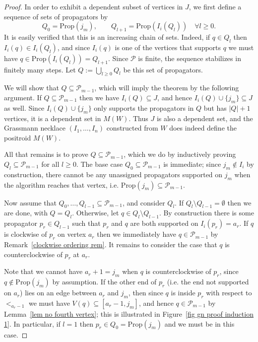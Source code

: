 \documentclass[11pt]{article}
\newcommand{\cP}{\mathcal{P}}
\newcommand{\Prop}{\textrm{Prop}}
\theoremstyle{remark}
\theoremstyle{definition}
\begin{document}
\begin{proof}
In order to exhibit a dependent subset of vertices in $J$, we first define a sequence of sets of propagators by
\[Q_0 = \Prop(j_m), \qquad Q_{l+1} = \Prop(I_i(Q_l))\quad \forall l \geq 0.\]
It is easily verified that this is an increasing chain of sets.  Indeed, if $q \in Q_l$ then $I_i(q) \in I_i(Q_l)$, and since $I_i(q)$ is one of the vertices that supports $q$ we must have $q \in \Prop(I_i(Q_l)) = Q_{l+1}$. Since $\cP$ is finite, the sequence stabilizes in finitely many steps. Let $Q := \bigcup_{l \geq 0} Q_l$ be this set of propagators.

We will show that $Q \subseteq \mathcal{P}_{m-1}$, which will imply the theorem by the following argument.  If $Q \subseteq \cP_{m-1}$ then we have $I_i(Q)\subseteq J$, and hence $I_i(Q) \cup \{j_m\} \subseteq J$ as well. Since $I_i(Q) \cup \{j_m\}$ only supports the propagators in $Q$ but has $|Q|+1$ vertices, it is a dependent set in $M(W)$. Thus $J$ is also a dependent set, and the Grassmann necklace $(I_1,\dots,I_n)$ constructed from $W$ does indeed define the positroid $M(W)$.

All that remains is to prove $Q\subseteq \mathcal{P}_{m-1}$, which we do by inductively proving $Q_l \subseteq \mathcal{P}_{m-1}$ for all $l \geq 0$. The base case $Q_0 \subseteq \cP_{m-1}$ is immediate; since $j_m \not\in I_i$ by construction, there cannot be any unassigned propagators supported on $j_m$ when the algorithm reaches that vertex, i.e. ${\Prop(j_m) \subseteq \cP_{m-1}}$.

Now assume that $Q_0,\dots,Q_{l-1} \subseteq \cP_{m-1}$, and consider $Q_{l}$. If $Q_{l} \setminus Q_{l-1} = \emptyset$ then we are done, with $Q = Q_l$.  Otherwise, let $q \in Q_{l} \setminus Q_{l-1}$. By construction there is some propagator $p_r \in Q_{l-1}$ such that $p_r$ and $q$ are both supported on $I_i(p_r) = a_r$. If $q$ is clockwise of $p_r$ on vertex $a_r$ then we immediately have $q \in \cP_{m-1}$ by Remark~\ref{clockwise ordering rem}.  It remains to consider the case that $q$ is counterclockwise of $p_r$ at $a_r$.

Note that we cannot have $a_r+ 1 = j_m$ when $q$ is counterclockwise of $p_r$, since $q \not\in \Prop(j_m)$ by assumption. If the other end of $p_r$ (i.e. the end not supported on $a_r$) lies on an edge between $a_r$ and $j_m$, then since $q$ is inside $p_r$ with respect to $<_{a_r-1}$ we must have $V(q) \subseteq [a_r-1,j_m]$, and hence $q \in \cP_{m-1}$ by Lemma~\ref{lem no fourth vertex}; this is illustrated in Figure~\ref{fig gn proof induction 1}. In particular, if $l=1$ then $p_r \in Q_{0} = \Prop(j_m)$ and we must be in this case. 


\end{proof}
\end{document}
